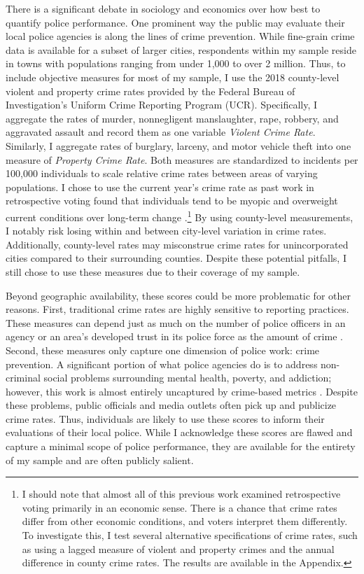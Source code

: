 There is a significant debate in sociology and economics over how best to quantify police performance. One prominent way the public may evaluate their local police agencies is along the lines of crime prevention. While fine-grain crime data is available for a subset of larger cities, respondents within my sample reside in towns with populations ranging from under 1,000 to over 2 million. Thus, to include objective measures for most of my sample, I use the 2018 county-level violent and property crime rates provided by the Federal Bureau of Investigation's Uniform Crime Reporting Program (UCR). Specifically, I aggregate the rates of murder, nonnegligent manslaughter, rape, robbery, and aggravated assault and record them as one variable \textit{Violent Crime Rate}. Similarly, I aggregate rates of burglary, larceny, and motor vehicle theft into one measure of \textit{Property Crime Rate}. Both measures are standardized to incidents per 100,000 individuals to scale relative crime rates between areas of varying populations. I chose to use the current year's crime rate as past work in retrospective voting found that individuals tend to be myopic and overweight current conditions over long-term change \citep[e.g.,][]{achenDemocracyRealistsWhy2016}.\footnote{I should note that almost all of this previous work examined retrospective voting primarily in an economic sense. There is a chance that crime rates differ from other economic conditions, and voters interpret them differently. To investigate this, I test several alternative specifications of crime rates, such as using a lagged measure of violent and property crimes and the annual difference in county crime rates. The results are available in the Appendix.} By using county-level measurements, I notably risk losing within and between city-level variation in crime rates. Additionally, county-level rates may misconstrue crime rates for unincorporated cities compared to their surrounding counties. Despite these potential pitfalls, I still chose to use these measures due to their coverage of my sample.  

Beyond geographic availability, these scores could be more problematic for other reasons. First, traditional crime rates are highly sensitive to reporting practices. These measures can depend just as much on the number of police officers in an agency or an area's developed trust in its police force as the amount of crime \citep{fieldingReassurancePolicingCommunity2006}. Second, these measures only capture one dimension of police work: crime prevention. A significant portion of what police agencies do is to address non-criminal social problems surrounding mental health, poverty, and addiction; however, this work is almost entirely uncaptured by crime-based metrics \citep{hodgkinsonCrimeRatesCommunity2019}. Despite these problems, public officials and media outlets often pick up and publicize crime rates. Thus, individuals are likely to use these scores to inform their evaluations of their local police. While I acknowledge these scores are flawed and capture a minimal scope of police performance, they are available for the entirety of my sample and are often publicly salient. 

